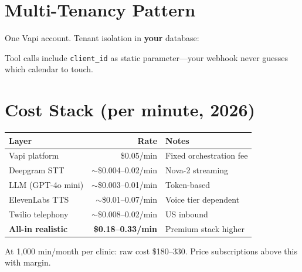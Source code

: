 \documentclass[11pt,a4paper]{article}
\begin{document}
\section{Multi-Tenancy Pattern}

One Vapi account. Tenant isolation in \textbf{your} database:

\begin{center}
\end{center}

Tool calls include \texttt{client\_id} as static parameter---your webhook never guesses which calendar to touch.

\section{Cost Stack (per minute, 2026)}

\begin{center}
\begin{tabular}{@{}lrl@{}}
\toprule
\textbf{Layer} & \textbf{Rate} & \textbf{Notes} \\
\midrule
Vapi platform & \$0.05/min & Fixed orchestration fee \\
Deepgram STT & $\sim$\$0.004--0.02/min & Nova-2 streaming \\
LLM (GPT-4o mini) & $\sim$\$0.003--0.01/min & Token-based \\
ElevenLabs TTS & $\sim$\$0.01--0.07/min & Voice tier dependent \\
Twilio telephony & $\sim$\$0.008--0.02/min & US inbound \\
\midrule
\textbf{All-in realistic} & \textbf{\$0.18--0.33/min} & Premium stack higher \\
\bottomrule
\end{tabular}
\end{center}

At 1{,}000 min/month per clinic: raw cost \$180--330. Price subscriptions above this with margin.
\end{document}

